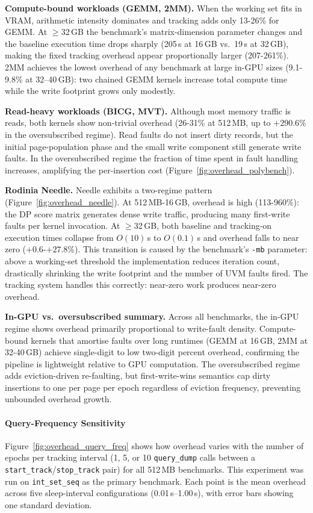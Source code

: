 \textbf{Compute-bound workloads (GEMM, 2MM).}\enspace
When the working set fits in VRAM, arithmetic intensity dominates and tracking
adds only 13-26\% for GEMM.
At $\geq$32\,GB the benchmark's matrix-dimension parameter changes and the
baseline execution time drops sharply (205\,s at 16\,GB vs.\ 19\,s at 32\,GB),
making the fixed tracking overhead appear proportionally larger (207-261\%).
2MM achieves the lowest overhead of any benchmark at large in-GPU sizes
(9.1-9.8\% at 32--40\,GB): two chained GEMM kernels increase total compute
time while the write footprint grows only modestly.

\textbf{Read-heavy workloads (BICG, MVT).}\enspace
Although most memory traffic is reads, both kernels show non-trivial overhead
(26-31\% at 512\,MB, up to $+290.6\%$ in the oversubscribed regime).
Read faults do not insert dirty records, but the initial page-population phase
and the small write component still generate write faults.
In the oversubscribed regime the fraction of time spent in fault handling
increases, amplifying the per-insertion cost (Figure~\ref{fig:overhead_polybench}).

\textbf{Rodinia Needle.}\enspace
Needle exhibits a two-regime pattern (Figure~\ref{fig:overhead_needle}).
At 512\,MB-16\,GB, overhead is high (113-960\%): the DP score matrix generates
dense write traffic, producing many first-write faults per kernel invocation.
At $\geq$32\,GB, both baseline and tracking-on execution times collapse from
$O(10)$\,s to $O(0.1)$\,s and overhead falls to near zero ($+0.6$-$+27.8\%$).
This transition is caused by the benchmark's \texttt{-mb} parameter: above a
working-set threshold the implementation reduces iteration count, drastically
shrinking the write footprint and the number of UVM faults fired.
The tracking system handles this correctly: near-zero work produces near-zero overhead.

\textbf{In-GPU vs.\ oversubscribed summary.}\enspace
Across all benchmarks, the in-GPU regime shows overhead primarily proportional
to write-fault density.
Compute-bound kernels that amortise faults over long runtimes (GEMM at 16\,GB,
2MM at 32-40\,GB) achieve single-digit to low two-digit percent overhead,
confirming the pipeline is lightweight relative to GPU computation.
The oversubscribed regime adds eviction-driven re-faulting, but first-write-wins
semantics cap dirty insertions to one per page per epoch regardless of eviction
frequency, preventing unbounded overhead growth.

\paragraph{Query-Frequency Sensitivity}
Figure~\ref{fig:overhead_query_freq} shows how overhead varies with the number
of epochs per tracking interval (1, 5, or 10 \texttt{query\_dump}
calls between a \texttt{start\_track}/\texttt{stop\_track} pair) for all
512\,MB benchmarks.
This experiment was run on \texttt{int\_set\_seq} as the primary benchmark.
Each point is the mean overhead across five sleep-interval configurations
(0.01\,s--1.00\,s), with error bars showing one standard deviation.


